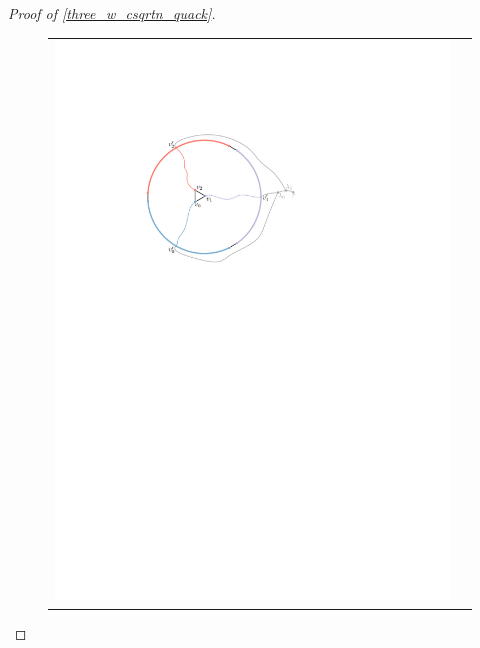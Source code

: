 \documentclass{patmorin}
\begin{document}
\begin{proof}[Proof of \cref{three_w_csqrtn_quack}]
\begin{figure}
\begin{tabular}{cc}
      \includegraphics[page=3]{figs/second_case} &

\end{tabular}
\end{figure}
\end{proof}
\end{document}
